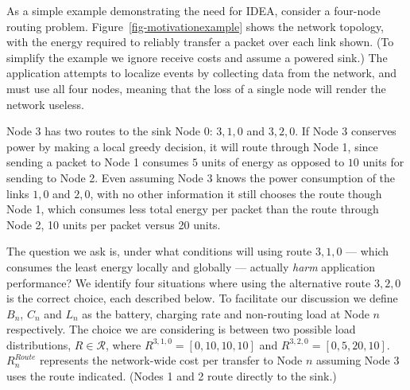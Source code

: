 As a simple example demonstrating the need for IDEA, consider a four-node
routing problem.  Figure~\ref{fig-motivationexample} shows the network
topology, with the energy required to reliably transfer a packet over each
link shown. (To simplify the example we ignore receive costs and assume a
powered sink.) The application attempts to localize events by collecting data
from the network, and must use all four nodes, meaning that the loss of a
single node will render the network useless.

Node 3 has two routes to the sink Node 0: $3,1,0$ and $3,2,0$. If Node 3
conserves power by making a local greedy decision, it will route through Node
1, since sending a packet to Node 1 consumes $5$ units of energy as opposed
to $10$ units for sending to Node 2. Even assuming Node 3 knows the power
consumption of the links $1,0$ and $2,0$, with no other information it still
chooses the route though Node 1, which consumes less total energy per packet
than the route through Node 2, 10 units per packet versus 20 units.

The question we ask is, under what conditions will using route $3,1,0$ ---
which consumes the least energy locally and globally --- actually
\textit{harm} application performance?  We identify four situations where
using the alternative route $3,2,0$ is the correct choice, each described
below. To facilitate our discussion we define $B_n$, $C_n$ and $L_n$ as the
battery, charging rate and non-routing load at Node $n$ respectively. The
choice we are considering is between two possible load distributions, $R \in
\mathcal{R}$, where $R^{3,1,0} = [0, 10, 10, 10]$ and $R^{3,2,0} = [0, 5, 20,
10]$.  $R^{Route}_n$ represents the network-wide cost per transfer to Node
$n$ assuming Node 3 uses the route indicated.  (Nodes 1 and 2 route directly
to the sink.)

